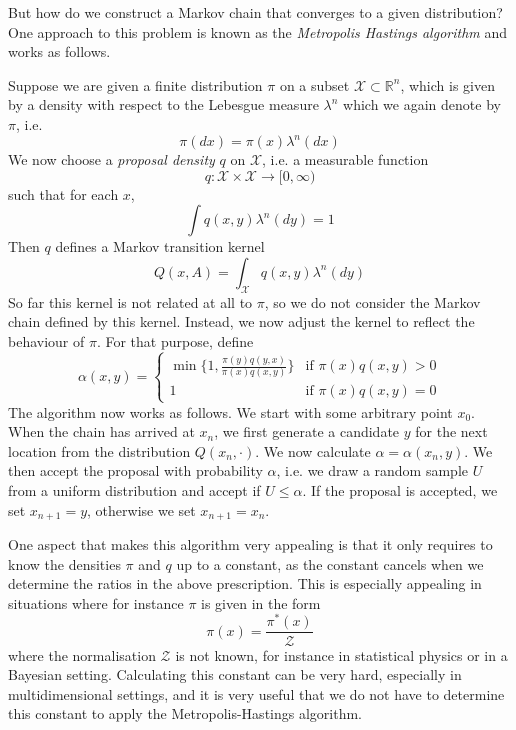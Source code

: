 \documentclass[a4paper, draft]{article}
\theoremstyle{own}
\theoremstyle{remark}
\newcommand{\R}{\mathbb{R}}
\begin{document}
But how do we construct a Markov chain that converges to a given distribution? One approach to this problem is known as the {\em Metropolis Hastings algorithm} and works as follows.

Suppose we are given a finite distribution $\pi$ on a subset ${\mathcal X} \subset\R^n$, which is given by a density with respect to the Lebesgue measure $\lambda^n$ which we again denote by $\pi$, i.e.
$$
\pi(dx) = \pi(x) \lambda^n(dx)
$$
We now choose a {\em proposal density} $q$ on ${\mathcal X}$, i.e. a measurable function 
$$
q \colon {\mathcal X} \times {\mathcal X} \rightarrow [0,\infty)
$$
such that for each $x$, 
$$
\int q(x,y) \lambda^n(dy) = 1
$$
Then $q$ defines a Markov transition kernel 
$$
Q(x,A) = \int_{\mathcal X} q(x,y) \lambda^n(dy)
$$
So far this kernel is not related at all to $\pi$, so we do not consider the Markov chain defined by this kernel. Instead, we now adjust the kernel to reflect the behaviour of $\pi$. For that purpose, define
$$
\alpha(x,y) = 
\begin{cases}
\min \{ 1, \frac{\pi(y)q(y,x)}{\pi(x)q(x,y)} \} & \text{if } \pi(x) q(x,y) > 0 \\
1 & \text{if } \pi(x) q(x,y) = 0 
\end{cases}
$$
The algorithm now works as follows. We start with some arbitrary point $x_0$. When the chain 
has arrived at $x_n$, we first generate a candidate $y$ for the next location from the 
distribution $Q(x_n, \cdot)$. We now calculate $\alpha = \alpha(x_n, y)$. We then accept the proposal with probability $\alpha$, i.e. we draw a random sample $U$ from a uniform distribution
and accept if $U \leq \alpha$. If the proposal is accepted, we set $x_{n+1} = y$, otherwise we set
$x_{n+1} = x_n$.

One aspect that makes this algorithm very appealing is that it only requires to know the densities $\pi$ and $q$ up to a constant, as the constant cancels when we determine the ratios in the above prescription. This is especially appealing in situations where for instance $\pi$ is given in the form
$$
\pi(x) = \frac{\pi^*(x)}{{\mathcal Z}}
$$
where the normalisation ${\mathcal Z}$ is not known, for instance in statistical physics or in a Bayesian setting. Calculating this constant can be very hard, especially in multidimensional settings, and it is very useful that we do not have to determine this constant to apply the Metropolis-Hastings algorithm.
\end{document}

